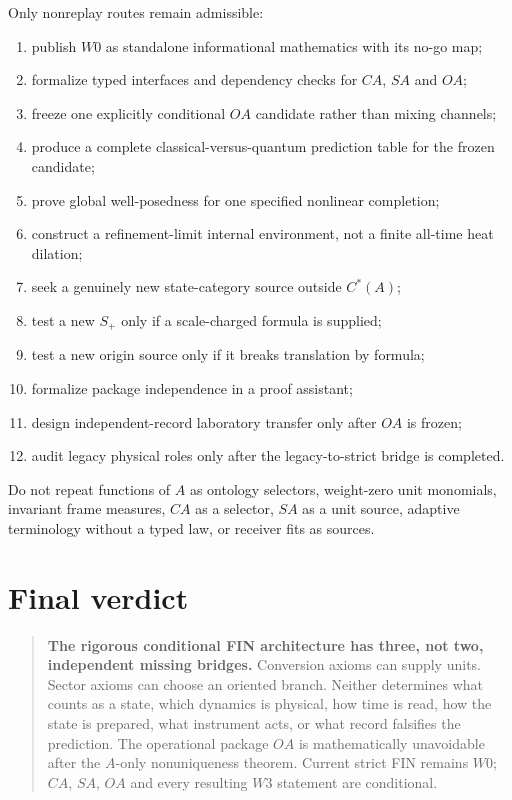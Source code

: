 \documentclass[11pt,a4paper]{article}
\begin{document}
Only nonreplay routes remain admissible:
\begin{enumerate}
\item publish $W0$ as standalone informational mathematics with its no-go map;
\item formalize typed interfaces and dependency checks for $CA$, $SA$ and $OA$;
\item freeze one explicitly conditional $OA$ candidate rather than mixing channels;
\item produce a complete classical-versus-quantum prediction table for the
      frozen candidate;
\item prove global well-posedness for one specified nonlinear completion;
\item construct a refinement-limit internal environment, not a finite all-time
      heat dilation;
\item seek a genuinely new state-category source outside $C^*(A)$;
\item test a new $S_+$ only if a scale-charged formula is supplied;
\item test a new origin source only if it breaks translation by formula;
\item formalize package independence in a proof assistant;
\item design independent-record laboratory transfer only after $OA$ is frozen;
\item audit legacy physical roles only after the legacy-to-strict bridge is
      completed.
\end{enumerate}

Do not repeat functions of $A$ as ontology selectors, weight-zero unit
monomials, invariant frame measures, $CA$ as a selector, $SA$ as a unit source,
adaptive terminology without a typed law, or receiver fits as sources.

\section{Final verdict}

\begin{quote}
\textbf{The rigorous conditional FIN architecture has three, not two,
independent missing bridges.}  Conversion axioms can supply units.  Sector
axioms can choose an oriented branch.  Neither determines what counts as a
state, which dynamics is physical, how time is read, how the state is prepared,
what instrument acts, or what record falsifies the prediction.  The operational
package $OA$ is mathematically unavoidable after the $A$-only nonuniqueness
theorem.  Current strict FIN remains $W0$; $CA$, $SA$, $OA$ and every resulting
$W3$ statement are conditional.
\end{quote}
\end{document}
